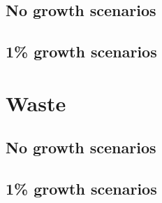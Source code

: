 \subsection{No growth scenarios}

\subsection{1\% growth scenarios}

\section{Waste}

\subsection{No growth scenarios}

\subsection{1\% growth scenarios}
